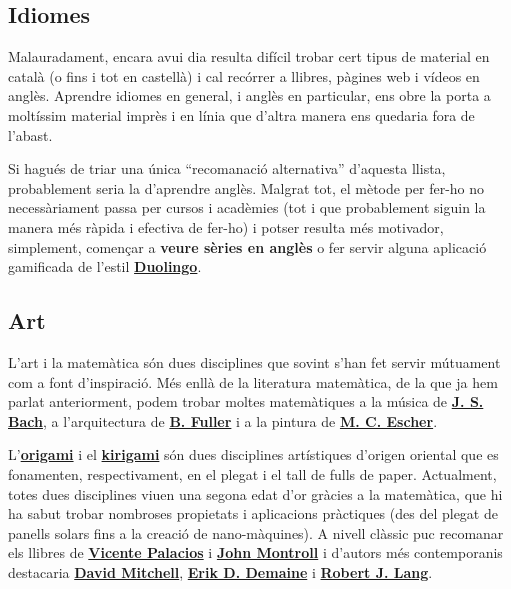 \documentclass[a4paper, 12pt]{article}
\begin{document}
        \subsection*{Idiomes}

            Malauradament, encara avui dia resulta difícil trobar cert tipus de material en català (o fins i tot en castellà) i cal recórrer a llibres, pàgines web i vídeos en anglès. Aprendre idiomes en general, i anglès en particular, ens obre la porta a moltíssim material imprès i en línia que d'altra manera ens quedaria fora de l'abast.

            Si hagués de triar una única ``recomanació alternativa'' d'aquesta llista, probablement seria la d'aprendre anglès. Malgrat tot, el mètode per fer-ho no necessàriament passa per cursos i acadèmies (tot i que probablement siguin la manera més ràpida i efectiva de fer-ho) i potser resulta més motivador, simplement, començar a \textbf{veure sèries en anglès} o fer servir alguna aplicació gamificada de l'estil \href{https://play.google.com/store/apps/details?id=com.duolingo}{\textbf{Duolingo}}.

        \subsection*{Art}

            L'art i la matemàtica són dues disciplines que sovint s'han fet servir mútuament com a font d'inspiració. Més enllà de la literatura matemàtica, de la que ja hem parlat anteriorment, podem trobar moltes matemàtiques a la música de \href{https://ca.wikipedia.org/wiki/Johann_Sebastian_Bach}{\textbf{J. S. Bach}}, a l'arquitectura de \href{https://ca.wikipedia.org/wiki/Buckminster_Fuller}{\textbf{B. Fuller}} i a la pintura de \href{https://ca.wikipedia.org/wiki/Maurits_Cornelis_Escher}{\textbf{M. C. Escher}}.

            L'\href{https://ca.wikipedia.org/wiki/Origami}{\textbf{origami}} i el \href{https://en.wikipedia.org/wiki/Kirigami}{\textbf{kirigami}} són dues disciplines artístiques d'origen oriental que es fonamenten, respectivament, en el plegat i el tall de fulls de paper. Actualment, totes dues disciplines viuen una segona edat d'or gràcies a la matemàtica, que hi ha sabut trobar nombroses propietats i aplicacions pràctiques (des del plegat de panells solars fins a la creació de nano-màquines). A nivell clàssic puc recomanar els llibres de \href{https://www.casadellibro.com/libros-ebooks/vicente-palacios/60484}{\textbf{Vicente Palacios}} i \href{https://en.wikipedia.org/wiki/John_Montroll}{\textbf{John Montroll}} i d'autors més contemporanis destacaria \href{http://www.origamiheaven.com/}{\textbf{David Mitchell}}, \href{https://en.wikipedia.org/wiki/Erik_Demaine}{\textbf{Erik D. Demaine}} i \href{https://en.wikipedia.org/wiki/Robert_J._Lang}{\textbf{Robert J. Lang}}.
\end{document}
